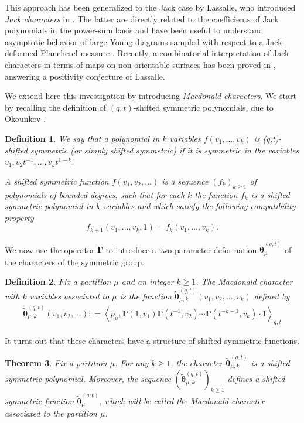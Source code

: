 \documentclass[12pt]{amsart}
\newtheorem{thm}{Theorem}[section]
\newtheorem{defi}[thm]{Definition}
\theoremstyle{remark}
\newcommand{\Mch}{\boldsymbol{\widetilde\theta}^{(q,t)}}
\newcommand{\GammaJ}{\boldsymbol{\Gamma}}
\begin{document}
This approach has been generalized to the Jack case by Lassalle, who introduced \textit{Jack characters} in \cite{Lassalle2008b}. The latter are directly related to the coefficients of Jack polynomials in the power-sum basis and have been useful to understand asymptotic behavior of large Young diagrams sampled with respect to a Jack deformed Plancherel measure \cite{CuencaDolegaMoll2023,DolegaFeray2016}.  Recently, a combinatorial interpretation of Jack characters in terms of maps on non orientable surfaces has been proved in \cite{BenDaliDolega2023}, answering a positivity conjecture of Lassalle. 

We extend here this investigation by introducing \textit{Macdonald characters}. We start by recalling the definition of $(q,t)$-shifted symmetric polynomials, due to Okounkov \cite{Okounkov1998}.
\begin{defi}\label{def:shiftedsymmetric}
    We say that a polynomial in $k$ variables $f(v_1,\dots,v_k)$ is (q,t)-shifted symmetric (or simply shifted symmetric) if it is symmetric in the variables $v_1,v_2t^{-1},\dots,v_k t^{1-k}.$ 
    
    A shifted symmetric function $f(v_1,v_2,\dots)$ is a sequence $(f_k)_{k\geq1}$ of polynomials of bounded degrees, such that for each $k$ the function $f_k$ is a shifted symmetric polynomial in $k$ variables and which satisfy the following compatibility property
$$f_{k+1}(v_1,\dots,v_k,1)=f_{k}(v_1,\dots,v_k).$$
\end{defi}
We now use the operator $\GammaJ$ to introduce a two parameter deformation $\Mch_\mu$ of the characters of the symmetric group. 
\begin{defi}
Fix a partition $\mu$ and an integer $k\geq 1$. The Macdonald character with $k$ variables associated to $\mu$  is the function $\Mch_{\mu,k}(v_1,v_2,\dots,v_k)$ defined by 
\begin{align}\label{eq def characters}
    \Mch_{\mu,k}(v_1,v_2,\dots ):
    =\left\langle p_\mu,\GammaJ(1,v_1)\GammaJ(t^{-1},v_2)\cdots \GammaJ(t^{-{k-1}},v_k) \cdot 1\right\rangle_{q,t}
\end{align}    
\end{defi}

It turns out that these characters have a structure of shifted symmetric functions.
\begin{thm}\label{thm Macdonald characters}
Fix a partition $\mu$. For any $k\geq 1$, the character $\Mch_{\mu,k}$ is a shifted symmetric polynomial.
Moreover, the sequence $(\Mch_{\mu,k})_{k\geq 1}$ defines a shifted symmetric function $\Mch_\mu$, which will be called the \emph{Macdonald character} associated to the partition $\mu$.
\end{thm}
\end{document}
